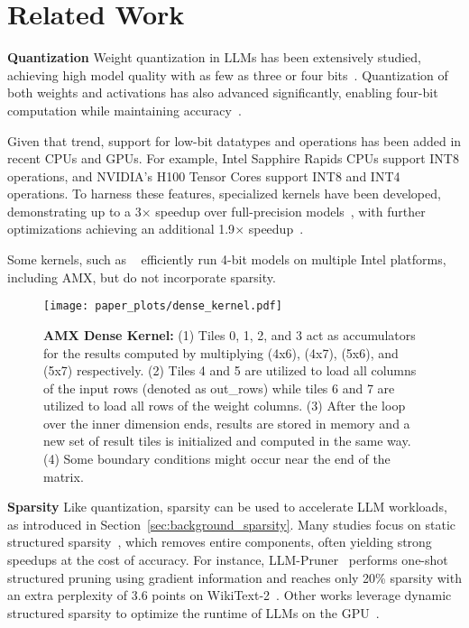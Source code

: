 \section{Related Work}
\textbf{Quantization} Weight quantization in LLMs has been extensively studied, achieving high model quality with as few as three or four bits~\cite{lin2024awq,frantar2022gptq,dettmers2022gpt3, dotzel2024students}. Quantization of both weights and activations has also advanced significantly, enabling four-bit computation while maintaining accuracy~\cite{xiao2023smoothquant, liu-etal-2023-llm}. 

Given that trend, support for low-bit datatypes and operations has been added in recent CPUs and GPUs. For example, Intel Sapphire Rapids CPUs support INT8 operations, and NVIDIA's H100 Tensor Cores support INT8 and INT4 operations. To harness these features, specialized kernels have been developed, demonstrating up to a 3$\times$ speedup over full-precision models~\cite{lin2024awq}, with further optimizations achieving an additional 1.9$\times$ speedup~\cite{kim2024quick}.

Some kernels, such as ~\cite{shen2023efficient} efficiently run 4-bit models on multiple Intel platforms, including AMX, but do not incorporate sparsity.

\begin{figure*} [t]
    \centering
    \texttt{[image: paper\_plots/dense\_kernel.pdf]}
    \vspace{-10pt}
    \caption{\textbf{AMX Dense Kernel: }(1) Tiles 0, 1, 2, and 3 act as accumulators for the results computed by multiplying (4x6), (4x7), (5x6), and (5x7) respectively. (2) Tiles 4 and 5 are utilized to load all columns of the input rows (denoted as out\_rows) while tiles 6 and 7 are utilized to load all rows of the weight columns. (3) After the loop over the inner dimension ends, results are stored in memory and a new set of result tiles is initialized and computed in the same way. (4) Some boundary conditions might occur near the end of the matrix.}
    \label{fig:dense_kernel}
\end{figure*}

\textbf{Sparsity} Like quantization, sparsity can be used to accelerate LLM workloads, as introduced in Section~\ref{sec:background_sparsity}. Many studies focus on static structured sparsity~\cite{ma2023llm, dery2024everybody}, which removes entire components, often yielding strong speedups at the cost of accuracy. For instance, LLM-Pruner~\cite{ma2023llm} performs one-shot structured pruning using gradient information and reaches only 20\% sparsity with an extra perplexity of 3.6 points on WikiText-2~\cite{merity2016pointer}. 
Other works leverage dynamic structured sparsity to optimize the runtime of LLMs on the GPU~\cite{liu2023deja, akhauri2024shadowllm}.

